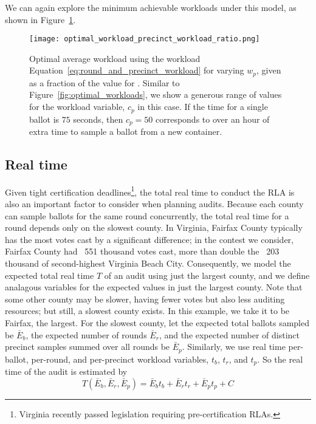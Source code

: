 We can again explore the minimum achievable workloads under this model, as shown in Figure~\ref{fig:optimal_workload_precinct_workload_ratio}.

\begin{figure}
\texttt{[image: optimal\_workload\_precinct\_workload\_ratio.png]}
\caption{Optimal average workload using the workload Equation~\ref{eq:round_and_precinct_workload} for varying $w_p$, given as a fraction of the value for \Providence. Similar to Figure~\ref{fig:optimal_workloads}, we show a generous range of values for the workload variable, $c_p$ in this case. If the time for a single ballot is $75$ seconds, then $c_p=50$ corresponds to over an hour of extra time to sample a ballot from a new container.}
\label{fig:optimal_workload_precinct_workload_ratio}
\end{figure}


\subsection{Real time}
Given tight certification deadlines\footnote{Virginia recently passed legislation requiring pre-certification RLAs.}, the total real time to conduct the RLA is also an important factor to consider when planning audits.
Because each county can sample ballots for the same round concurrently, the total real time for a round depends only on the slowest county. 
In Virginia, Fairfax County typically has the most votes cast by a significant difference; in the contest we consider, Fairfax County had ~551 thousand votes cast, more than double the ~203 thousand of second-highest Virginia Beach City.
Consequently, we model the expected total real time $T$ of an audit using just the largest county, and we define analagous variables for the expected values in just the largest county.
Note that some other county may be slower, having fewer votes but also less auditing resources; but still, a slowest county exists. In this example, we take it to be Fairfax, the largest.
For the slowest county, let the expected total ballots sampled be $\bar E_b$, the expected number of rounds $\bar E_r$, and the expected number of distinct precinct samples summed over all rounds be $\bar E_p$.
Similarly, we use real time per-ballot, per-round, and per-precinct workload variables, $t_b$, $t_r$, and $t_p$. So the real time of the audit is estimated by
\begin{equation}
T(\bar E_b, \bar E_r, \bar E_p ) = \bar E_b t_b + \bar E_r t_r + \bar E_p t_p + C
\label{eq:real_time}
\end{equation}

